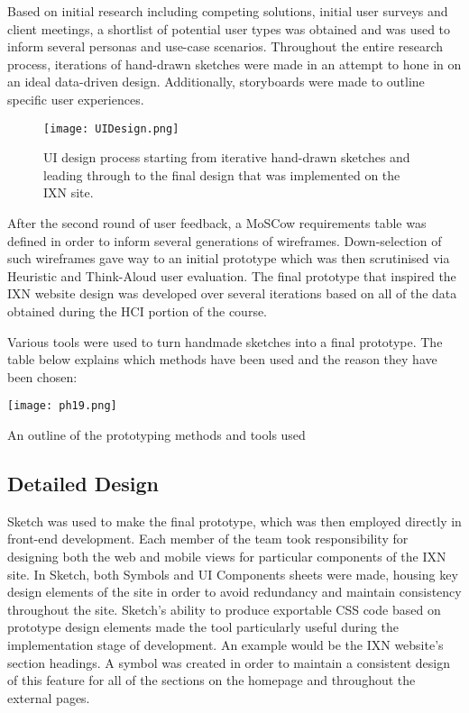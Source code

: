 \documentclass[fontsize=11pt]{extarticle}
\numberwithin{figure}{section} %
\numberwithin{table}{section}%
\begin{document}
Based on initial research including competing solutions, initial user
surveys and client meetings, a shortlist of potential user types was
obtained and was used to inform several personas and use-case scenarios.
Throughout the entire research process, iterations of hand-drawn
sketches were made in an attempt to hone in on an ideal data-driven
design. Additionally, storyboards were made to outline specific user
experiences.

\begin{figure}[H]
\centering
\texttt{[image: UIDesign.png]}
\caption{UI design process starting from iterative hand-drawn sketches and leading through to the final design that was implemented on the IXN site.}
\label{UIDesign}
\end{figure}

After the second round of user feedback, a MoSCow requirements table was
defined in order to inform several generations of wireframes.
Down-selection of such wireframes gave way to an initial prototype which
was then scrutinised via Heuristic and Think-Aloud user evaluation. The
final prototype that inspired the IXN website design was developed over
several iterations based on all of the data obtained during the HCI
portion of the course.

Various tools were used to turn handmade sketches into a final
prototype. The table below explains which methods have been used and the
reason they have been chosen:

\begin{table}[H]
      \centering
      \texttt{[image: ph19.png]}
      \caption{An outline of the prototyping methods and tools used}
 \end{table}

\hypertarget{detailed-design}{%
\subsection{Detailed Design}\label{detailed-design}}

Sketch was used to make the final prototype, which was then employed
directly in front-end development. Each member of the team took
responsibility for designing both the web and mobile views for
particular components of the IXN site. In Sketch, both Symbols and UI
Components sheets were made, housing key design elements of the site in
order to avoid redundancy and maintain consistency throughout the site.
Sketch's ability to produce exportable CSS code based on prototype
design elements made the tool particularly useful during the
implementation stage of development. An example would be the IXN
website's section headings. A symbol was created in order to maintain a
consistent design of this feature for all of the sections on the
homepage and throughout the external pages.
\end{document}
